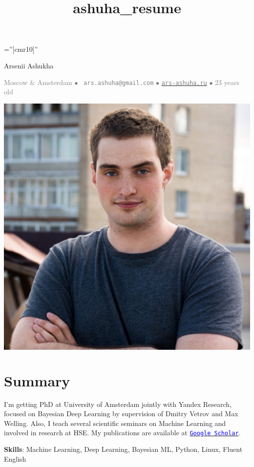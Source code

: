 \documentclass[a4paper,10pt]{article} %
\title{ashuha_resume}
\begin{document}
\pagestyle{empty} %

\font\fb=''[cmr10]'' %
\oddsidemargin=0pt 		%

\begin{center}
	{\huge Arsenii Ashukha}
\end{center}
\begin{center}
\textcolor{gray}{
Moscow \& Amsterdam $\bullet$ 
\Letter~\textcolor{gray}{\texttt{ars.ashuha@gmail.com}} $\bullet$ \href{https://ars-ashuha.ru/}{\textcolor{gray}{\texttt{ars-ashuha.ru}}} $\bullet$
23 years old} 

\end{center}
\setlength{\columnsep}{-330pt}
\begin{multicols}{2}
\includegraphics[scale=0.07]{../images/avatar_v3}

\section{Summary}
 \vspace{-0.2cm}
I'm getting PhD at University of Amsterdam jointly with Yandex Research, focused on Bayesian Deep Learning by supervision of Dmitry Vetrov and Max Welling.
Also, I teach several scientific seminars on Machine Learning and involved in research at HSE. 
My publications are available at \href{https://scholar.google.com/citations?user=IU-kuP8AAAAJ&hl=en}{\texttt{\textcolor{blue}{Google Scholar}}}.

\vspace{0.2cm}
\textbf{Skills}: Machine Learning, Deep Learning, Bayesian ML, Python, Linux, Fluent English

\end{multicols}
\end{document}
